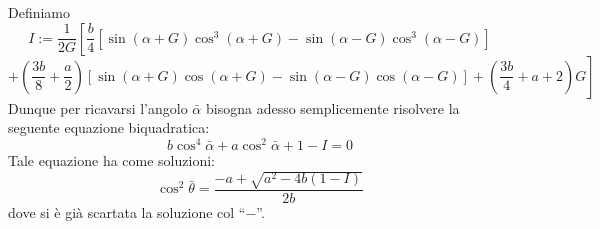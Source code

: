Definiamo
$$ I := \frac{1}{2G} \left[ \frac{b}{4}\left[ \sin \left( \alpha + G \right) \cos^3 \left( \alpha + G \right) - \sin \left( \alpha - G \right) \cos^3 \left( \alpha - G \right) \right] \right. $$
$$ \left. + \left( \frac{3b}{8} + \frac{a}{2} \right)\left[ \sin \left( \alpha + G \right) \cos \left( \alpha + G \right) - \sin \left( \alpha - G \right) \cos \left( \alpha - G \right) \right] 
+ \left( \frac{3b}{4} + a + 2 \right) G \right] $$
Dunque per ricavarsi l'angolo $ \bar \alpha $ bisogna adesso semplicemente risolvere la seguente equazione biquadratica: 
$$ b \cos^4 \bar\alpha + a \cos ^ 2 \bar \alpha + 1 - I= 0 $$
Tale equazione ha come soluzioni:
$$ \cos^2 \bar \theta  = \frac{-a + \sqrt{a^2 - 4b(1 - I)}}{2b} $$
dove si è già scartata la soluzione col ``$-$''.


